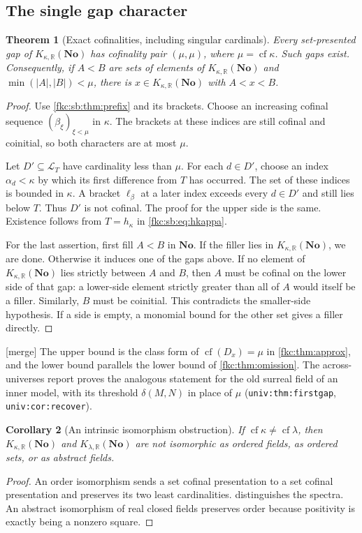 \documentclass[11pt,letterpaper]{article}
\numberwithin{equation}{section}
\newtheorem{theorem}{Theorem}[section]
\newtheorem{corollary}[theorem]{Corollary}
\theoremstyle{definition}
\theoremstyle{remark}
\newcommand{\R}{\mathbb R}
\newcommand{\No}{\mathbf{No}}
\newcommand{\cf}{\operatorname{cf}}
\newcommand{\mergetag}{\textup{\textsf{\small[merge]}}}%
\newcommand{\card}[1]{\lvert #1\rvert}
\newcommand{\KN}[2]{K_{#1,#2}(\No)}%
\newcommand{\lbl}[1]{\nolinkurl{#1}}%
\begin{document}
\subsection{The single gap character}
\begin{theorem}[Exact cofinalities, including singular cardinals]\label{fkc:sb:thm:gapcharacter}
Every set-presented gap of $\KN\kappa\R$ has cofinality pair $(\mu,\mu)$, where $\mu=\cf\kappa$. Such gaps exist. Consequently, if $A<B$ are sets of elements of $\KN\kappa\R$ and $\min(\card A,\card B)<\mu$, there is $x\in\KN\kappa\R$ with $A<x<B$.
\end{theorem}
\begin{proof}
Use \cref{fkc:sb:thm:prefix} and its brackets. Choose an increasing cofinal sequence $(\beta_\xi)_{\xi<\mu}$ in $\kappa$. The brackets at these indices are still cofinal and coinitial, so both characters are at most $\mu$.

Let $D'\subseteq\mathcal L_T$ have cardinality less than $\mu$. For each $d\in D'$, choose an index $\alpha_d<\kappa$ by which its first difference from $T$ has occurred. The set of these indices is bounded in $\kappa$. A bracket $\ell_\beta$ at a later index exceeds every $d\in D'$ and still lies below $T$. Thus $D'$ is not cofinal. The proof for the upper side is the same. Existence follows from $T=h_\kappa$ in \eqref{fkc:sb:eq:hkappa}.

For the last assertion, first fill $A<B$ in $\No$. If the filler lies in $\KN\kappa\R$, we are done. Otherwise it induces one of the gaps above. If no element of $\KN\kappa\R$ lies strictly between $A$ and $B$, then $A$ must be cofinal on the lower side of that gap: a lower-side element strictly greater than all of $A$ would itself be a filler. Similarly, $B$ must be coinitial. This contradicts the smaller-side hypothesis. If a side is empty, a monomial bound for the other set gives a filler directly.
\end{proof}
\mergetag{} The upper bound is the class form of $\cf(D_x)=\mu$ in \cref{fkc:thm:approx}, and the lower bound parallels the lower bound of \cref{fkc:thm:omission}. The across-universes report proves the analogous statement for the old surreal field of an inner model, with its threshold $\delta(M,N)$ in place of $\mu$ (\lbl{univ:thm:firstgap}, \lbl{univ:cor:recover}).

\begin{corollary}[An intrinsic isomorphism obstruction]\label{fkc:sb:cor:noniso}
If $\cf\kappa\ne\cf\lambda$, then $\KN\kappa\R$ and $\KN\lambda\R$ are not isomorphic as ordered fields, as ordered sets, or as abstract fields.
\end{corollary}
\begin{proof}
An order isomorphism sends a set cofinal presentation to a set cofinal presentation and preserves its two least cardinalities.  distinguishes the spectra. An abstract isomorphism of real closed fields preserves order because positivity is exactly being a nonzero square.
\end{proof}
\end{document}
